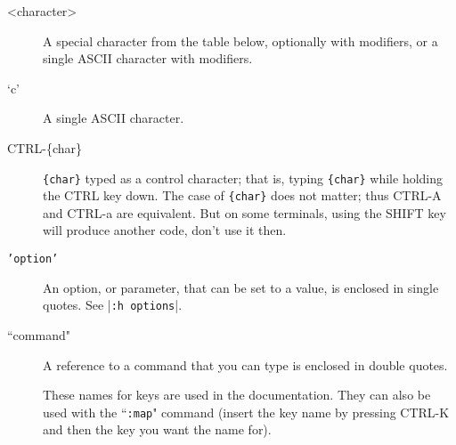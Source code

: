 \begin{description}
				\item[<character>]
								\label{<character>}
								A special character from the table below, optionally with modifiers, or a single ASCII character with modifiers.

				\item[`c']
								\label{'character'}
								A single ASCII character.

				\item[CTRL-\{char\}]
								\label{CTRL-{char}}
								\texttt{\{char\}} typed as a control character; that is, typing \texttt{\{char\}} while holding the CTRL key down.
								The case of \texttt{\{char\}} does not matter; thus CTRL-A and CTRL-a are equivalent.
								But on some terminals, using the SHIFT key will produce another code, don't use it then.

				\item[\texttt{'option'}]
								\label{'option'}
								An option, or parameter, that can be set to a value, is enclosed in single quotes.
								See |\texttt{:h options}|.

				\item[``command"]
								\label{quotecommandquote}
								A reference to a command that you can type is enclosed in double quotes.

				\item[]
								\label{key-notation}
								\label{key-codes}
								\label{keycodes}
These names for keys are used in the documentation.
They can also be used with the ``\texttt{:map}" command (insert the key name by pressing CTRL-K and then the key you want the name for).

\begin{center}\begin{tabularx}{\textwidth}{|l|X|l|l|} %


\end{tabularx}
\end{center}
\end{description}
